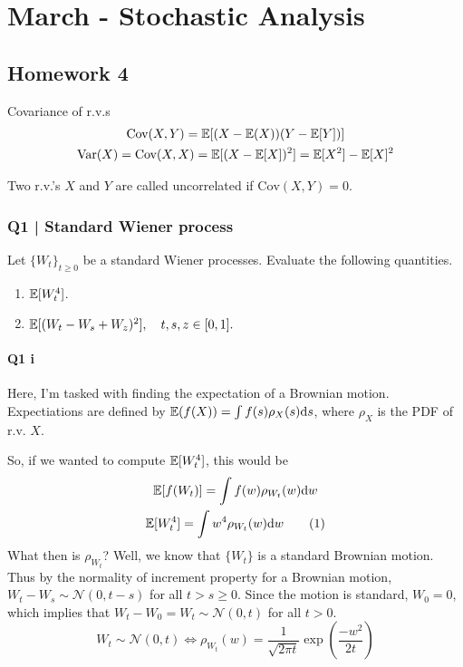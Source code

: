 \chapter{March - Stochastic Analysis }

\section{Homework 4}


\begin{definition}{Covariance of r.v.s}{}
	\begin{gather*}
		\text{Cov}(X, Y) = \mathbb{E}[(X - \mathbb{E}(X))(Y - \mathbb{E}[Y])] \\
		\text{Var}(X) = \text{Cov}(X, X) = \mathbb{E}[(X - \mathbb{E}[X])^2] = \mathbb{E}[X^2] - \mathbb{E}[X]^2
	\end{gather*}
\end{definition}

\cloze Two r.v.'s $X$ and $Y$ are called uncorrelated if $\text{Cov}(X, Y) = 0$. 

\subsection*{Q1 | Standard Wiener process}
Let $\{ W_t\}_{t\geq 0}$ be a standard Wiener processes. Evaluate the following quantities. 

\begin{enumerate}[label=(\roman*)] 
\item %
$\mathbb{E}[W_t^4]$.

\item %
$\mathbb{E}[(W_t - W_s + W_z)^2], \quad t, s, z \in [0, 1].$
\end{enumerate} %

\subsubsection*{Q1 i}
Here, I'm tasked with finding the expectation of a Brownian motion. Expectiations are defined by $\mathbb{E}(f(X)) = \int f(s) \rho_X(s) \text{d} s$, where $\rho_X$ is the PDF of r.v. $X$. 

So, if we wanted to compute $\mathbb{E}[W_t^4]$, this would be 
\begin{gather*}
	\mathbb{E}[f(W_t)] = \int f(w) \rho_{W_t}(w) \text{d} w	 \\
	\mathbb{E}[W_t^4] = \int w^4 \rho_{W_t}(w) \text{d} w \tag{1} 
\end{gather*}
What then is $\rho_{W_t}$? Well, we know that $\{W_t\}$ is a standard Brownian motion. Thus by the normality of increment property for a Brownian motion, $W_t - W_s \sim \mathcal{N}(0, t-s)$ for all $t >s \geq 0$. Since the motion is standard, $W_0 = 0$, which implies that $W_t - W_0  = W_t \sim \mathcal{N}(0, t)$ for all $t > 0$. 
\[ W_t \sim\mathcal{N}(0, t) \iff \rho_{W_t}(w) = \frac{1}{\sqrt{2\pi t}} \exp\left(\frac{-w^2}{2t} \right) \tag{2} \]

